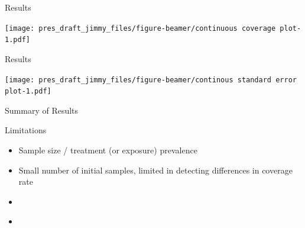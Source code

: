 \documentclass[
  ignorenonframetext,
]{beamer}
\providecommand{\tightlist}{%
  \setlength{\itemsep}{0pt}\setlength{\parskip}{0pt}}
\begin{document}
\begin{frame}{Results}
\protect\hypertarget{results-2}{}

\texttt{[image: pres\_draft\_jimmy\_files/figure-beamer/continuous coverage plot-1.pdf]}

\end{frame}

\begin{frame}{Results}
\protect\hypertarget{results-3}{}

\texttt{[image: pres\_draft\_jimmy\_files/figure-beamer/continous standard error plot-1.pdf]}

\end{frame}

\begin{frame}{Summary of Results}
\protect\hypertarget{summary-of-results}{}

\end{frame}

\begin{frame}{Limitations}
\protect\hypertarget{limitations}{}

\begin{itemize}[<+->]
\tightlist
\item
  Sample size / treatment (or exposure) prevalence
\end{itemize}

\begin{itemize}[<+->]
\tightlist
\item
  Small number of initial samples, limited in detecting differences in
  coverage rate
\end{itemize}

\begin{itemize}[<+->]
\item
\end{itemize}

\begin{itemize}[<+->]
\item
\end{itemize}

\end{frame}
\end{document}

